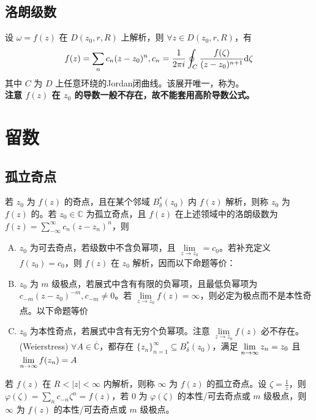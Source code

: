 \documentclass[./main.tex]{subfiles}
\begin{document}
\subsection{洛朗级数}
设 $\omega=f(z)$ 在 $D(z_0,r,R)$ 上解析，则 $\forall z\in D(z_0,r,R)$，有 
\begin{equation}
    f(z)=\sum_nc_n(z-z_0)^n,c_n=\frac{1}{2\pi i}\oint_C\frac{f(\zeta)}{(z-z_0)^{n+1}}\text{d}\zeta
\end{equation}
其中 $C$ 为 $D$ 上任意环绕的Jordan闭曲线。该展开唯一，称为。\\
\textbf{注意 $f(z)$ 在 $z_0$ 的导数一般不存在，故不能套用高阶导数公式。}
\section{留数}
\subsection{孤立奇点}
若 $z_0$ 为 $f(z)$ 的奇点，且在某个邻域 $B_{\delta}^*(z_0)$ 内 $f(z)$ 解析，则称 $z_0$ 为 $f(z)$ 的。若 $z_0\in\mathbb{C}$ 为孤立奇点，且 $f(z)$ 在上述领域中的洛朗级数为 $f(z)=\sum_{-\infty}^{\infty}c_n(z-z_n)^n$，则
\begin{enumerate}[(A)]
    \item $z_0$ 为可去奇点，若级数中不含负幂项，且 $\lim\limits_{z\rightarrow z_0}=c_0$。若补充定义 $f(z_0)=c_0$，则 $f(z)$ 在 $z_0$ 解析，因而以下命题等价：
    \item $z_0$ 为 $m$ 级极点，若展式中含有有限的负幂项，且最低负幂项为 $c_{-m}(z-z_0)^{-m},c_{-m}\neq 0$。若 $\lim\limits_{z\rightarrow z_0}f(z)=\infty$，则必定为极点而不是本性奇点。以下命题等价
    \item $z_0$ 为本性奇点，若展式中含有无穷个负幂项。注意 $\lim\limits_{z\rightarrow z_0}f(z)$ 必不存在。\\
    (Weierstress) $\forall A\in\overline{\mathbb{C}}$，都存在 $\{z_n\}_{n=1}^{\infty}\subseteq B_{\delta}^*(z_0)$，满足 $\lim\limits_{n\rightarrow\infty}z_n=z_0$ 且 $\lim\limits_{n\rightarrow\infty}f(z_n)=A$
\end{enumerate}
若 $f(z)$ 在 $R<|z|<\infty$ 内解析，则称 $\infty$ 为 $f(z)$ 的孤立奇点。设 $\zeta=\frac{1}{z}$，则 $\varphi(\zeta)=\sum_n c_{-n}\zeta^n=f(z)$，若 $0$ 为 $\varphi(\zeta)$ 的本性/可去奇点或 $m$ 级极点，则 $\infty$ 为 $f(z)$ 的本性/可去奇点或 $m$ 级极点。
\end{document}

